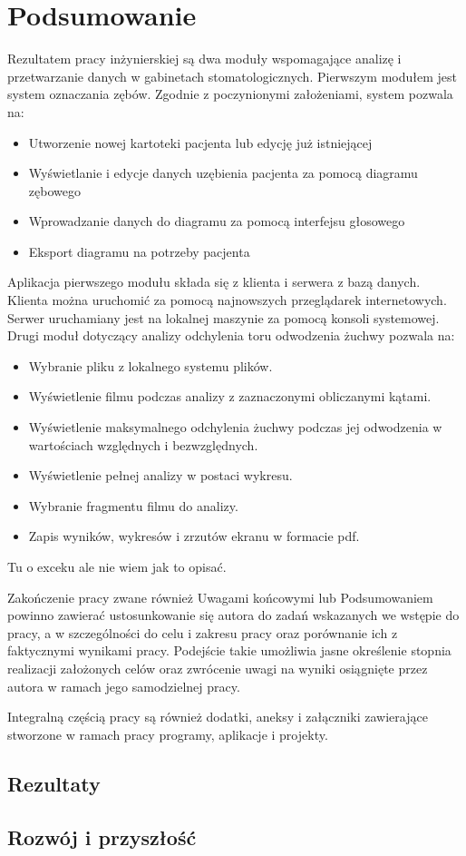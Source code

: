
\chapter{Podsumowanie} 

Rezultatem pracy inżynierskiej są dwa moduły wspomagające analizę i przetwarzanie danych w gabinetach stomatologicznych. Pierwszym modułem jest system oznaczania zębów. Zgodnie z poczynionymi założeniami, system pozwala na:
\begin{itemize}
    \item Utworzenie nowej kartoteki pacjenta lub edycję już istniejącej
    \item Wyświetlanie i edycje danych uzębienia pacjenta za pomocą diagramu zębowego
    \item Wprowadzanie danych do diagramu za pomocą interfejsu głosowego
    \item Eksport diagramu na potrzeby pacjenta
\end{itemize}
Aplikacja pierwszego modułu składa się z klienta i serwera z bazą danych. Klienta można uruchomić za pomocą  najnowszych przeglądarek internetowych. Serwer uruchamiany jest na lokalnej maszynie za pomocą konsoli systemowej.
\newline Drugi moduł dotyczący analizy odchylenia toru odwodzenia żuchwy pozwala na:
\begin{itemize}
    \item Wybranie pliku z lokalnego systemu plików.
    \item Wyświetlenie filmu podczas analizy z zaznaczonymi obliczanymi kątami.
    \item Wyświetlenie maksymalnego odchylenia żuchwy podczas jej odwodzenia w wartościach względnych i bezwzględnych.
    \item Wyświetlenie pełnej analizy w postaci wykresu.
    \item Wybranie fragmentu filmu do analizy.
    \item Zapis wyników, wykresów i zrzutów ekranu w formacie pdf.
\end{itemize}
Tu o exceku ale nie wiem jak to opisać.


Zakończenie pracy zwane również Uwagami końcowymi lub Podsumowaniem powinno zawierać ustosunkowanie
się autora do zadań wskazanych we wstępie do pracy, a w szczególności do celu i zakresu pracy oraz
porównanie ich z faktycznymi wynikami pracy. Podejście takie umożliwia jasne określenie stopnia
realizacji założonych celów oraz zwrócenie uwagi na wyniki osiągnięte przez autora w ramach jego
samodzielnej pracy.

Integralną częścią pracy są również dodatki, aneksy i załączniki zawierające stworzone w ramach pracy programy, aplikacje i projekty.

\section{Rezultaty}
\section{Rozwój i przyszłość}